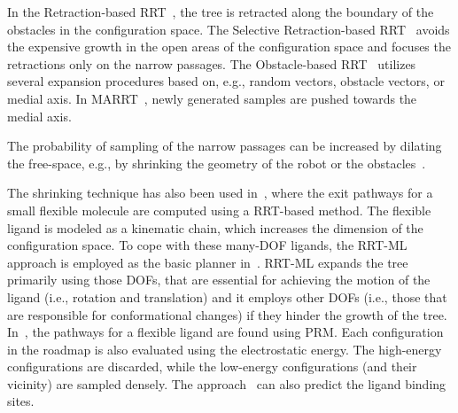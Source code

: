 \documentclass[usletter, 10pt, conference]{ieeeconf} %
\def\qrand{q_{rand}}
\def\qnear{q_{near}}
\begin{document}

In the Retraction-based RRT~\cite{zhangRetraction}, the tree is retracted along the boundary of the obstacles in the configuration space.
The Selective Retraction-based RRT~\cite{lee2012srrrt} avoids the expensive growth in the open areas of the configuration space and focuses the retractions only on the narrow passages.
The Obstacle-based RRT~\cite{amatoOBRRT} utilizes several expansion procedures based on, e.g., random vectors, obstacle vectors, or medial axis.
In MARRT~\cite{denny2014marrt}, newly generated samples are pushed towards the medial axis.

The probability of sampling of the narrow passages can be increased by dilating the free-space, e.g., by shrinking the geometry of the robot or the obstacles~\cite{bayazitIRC}.

The shrinking technique has also been used in~\cite{cortes2010simulating}, where the exit pathways for a small flexible molecule are computed using a RRT-based method.
The flexible ligand is modeled as a kinematic chain, which increases the dimension of the configuration space.
To cope with these many-DOF ligands, the RRT-ML~\cite{cortes2007mlrrt} approach is employed as the basic planner in~\cite{cortes2010simulating}.
RRT-ML expands the tree primarily using those DOFs, that are essential for achieving the motion of the ligand (i.e., rotation
and translation) and it employs other DOFs (i.e., those that are responsible for conformational changes) if they hinder the growth of the tree.
In~\cite{singhLIG}, the pathways for a flexible ligand are found using PRM.
Each configuration in the roadmap is also evaluated using the electrostatic energy.
The high-energy configurations are discarded, while the low-energy configurations (and their vicinity) are sampled densely.
The approach~\cite{singhLIG} can also predict the ligand binding sites.
\end{document}

